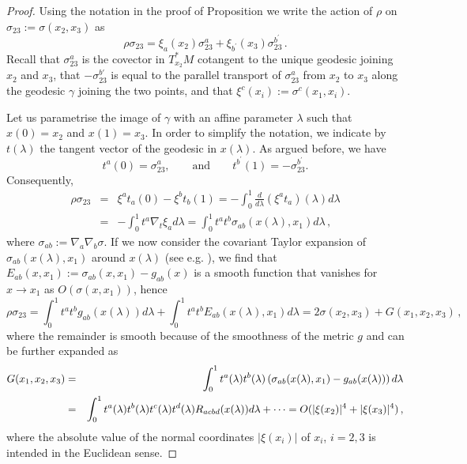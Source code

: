 \documentclass[11pt]{book}
\theoremstyle{break}
\begin{document}
\begin{proof}





Using the notation in the proof of Proposition %
we write the action of $\rho$ on $\sigma_{23}:=\sigma(x_2,x_3)$ as
\[
\rho \sigma_{23}  =    \xi_a(x_2) \sigma^a_{23} + \xi_{b^\prime}(x_3)\sigma^{b^\prime}_{23}\,.
\]
Recall that $\sigma_{23}^a$ is the covector in $T^*_{x_2}M$ cotangent to the unique geodesic joining $x_2$ and $x_3$, that $-\sigma^{b'}_{23}$ is equal to the parallel transport of $\sigma^a_{23}$ from $x_2$ to $x_3$ along the geodesic $\gamma$ joining the two points, and that $\xi^c(x_i):=\sigma^c(x_1,x_i)$.


Let us parametrise the image of $\gamma$ with an affine parameter $\lambda$ such that $x(0) = x_2$ and $x(1) = x_3$. In order to simplify the notation, we indicate by $t(\lambda)$ the tangent vector of the geodesic in $x(\lambda)$. As argued before, we have
\[
t^a(0)=\sigma^a_{23},\qquad \text{and}\qquad t^{b^\prime}(1)=-\sigma^{b^\prime}_{23}.
\]   
Consequently,
\begin{eqnarray*}
\rho \sigma_{23}
&=& \xi^a t_a (0) - \xi^b t_b(1) 
= - \int_{0}^{1} \frac{d}{d\lambda} (\xi^a t_a)(\lambda) d\lambda \\
&=& - \int_{0}^{1} t^a \nabla_t  \xi_a   d\lambda  
= \int_{0}^{1} t^a t^b \sigma_{ab}(x(\lambda),x_1) d\lambda\,,
\end{eqnarray*}
where $\sigma_{ab} := \nabla_a\nabla_b \sigma$. If we now consider the covariant Taylor expansion of $\sigma_{ab}(x(\lambda),x_1)$ around $x(\lambda)$ (see e.g. %
), we find that $E_{ab}(x,x_1):=\sigma_{ab}(x,x_1) - g_{ab}(x) $ is a smooth function that vanishes for $x\to x_1$ as $O(\sigma(x,x_1))$, hence
\[
\rho\sigma_{23}  = \int_{0}^{1} t^a t^b g_{ab}(x(\lambda))    d\lambda +  \int_{0}^{1} t^a t^b E_{ab}(x(\lambda),x_1)    d\lambda  = 2\sigma(x_2,x_3) + G(x_1,x_2,x_3)\,,
\]
where the remainder is smooth because of the smoothness of the metric $g$ and can be further expanded as 
\begin{eqnarray}\label{eq:remainder-sigma}
G(x_1,x_2,x_3) &=& \int_{0}^{1} t^a(\lambda) t^b(\lambda) \left(\sigma_{ab}(x(\lambda),x_1) - g_{ab}(x(\lambda))\right) d\lambda\\ &=&  
\int_{0}^{1} t^a(\lambda) t^b(\lambda) t^c(\lambda) t^d(\lambda) R_{acbd}(x(\lambda))d\lambda + \dots = O(|\xi(x_2)|^4+|\xi(x_3)|^4)\,,\notag
\end{eqnarray}
where the absolute value of the normal coordinates $|\xi(x_i)|$ of $x_i$, $i=2,3$ is intended in the Euclidean sense.




\end{proof}
\end{document}
